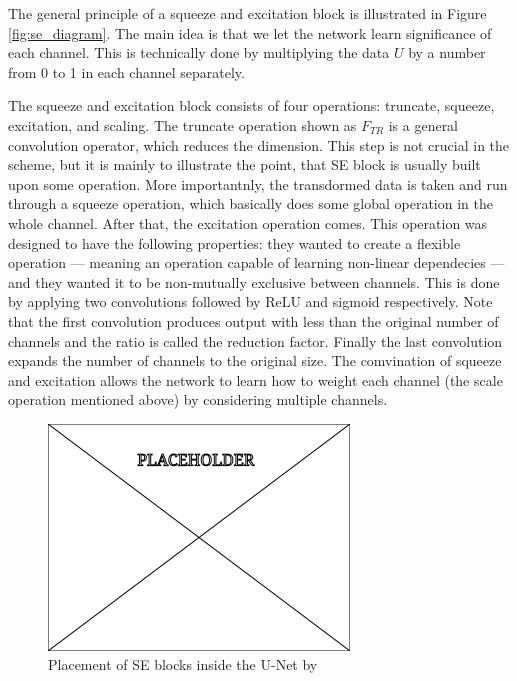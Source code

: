 \documentclass[
  digital,     %
  oneside,     %
  nosansbold,  %
  nocolorbold, %
  lof,         %
  lot,         %
]{fithesis4}
\begin{document}
The general principle of a squeeze and excitation block is illustrated in Figure
\ref{fig:se_diagram}. The main idea is that we let the network learn
significance of each channel. This is technically done by multiplying the data
$U$ by a number from 0 to 1 in each channel separately.

The squeeze and excitation block consists of four operations: truncate, squeeze,
excitation, and scaling. The truncate operation shown as $F_{TR}$ is a general
convolution operator, which reduces the dimension. This step is not crucial in
the scheme, but it is mainly to illustrate the point, that SE block is usually
built upon some operation. More importantnly, the transdormed data is taken and
run through a squeeze operation, which basically does some global operation in the
whole channel. After that, the excitation operation comes. This operation was
designed to have the following properties: they wanted to create a flexible
operation --- meaning an operation capable of learning non-linear dependecies
--- and they wanted it to be non-mutually exclusive between channels. This is
done by applying two convolutions followed by ReLU and sigmoid respectively.
Note that the first convolution produces output with less than the original
number of channels and the ratio is called the reduction factor. Finally the
last convolution expands the number of channels to the original size. The
comvination of squeeze and excitation allows the network to learn how to weight
each channel (the scale operation mentioned above) by considering multiple
channels.

\begin{figure}
    \begin{center}
        \includegraphics[width=0.6\linewidth]{resources/placeholder.png}
    \end{center}
    \caption{Placement of SE blocks inside the U-Net by \parencite{Rundo2019}}
    \label{fig:se_unet}
\end{figure}
\end{document}
